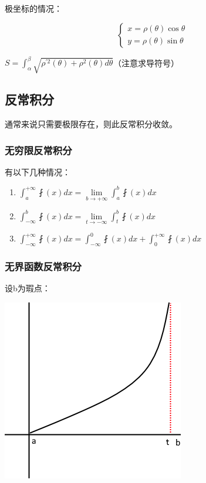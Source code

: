\documentclass[UTF8]{ctexbook}
\newcommand{\limNormal}[1]{\lim\limits_{#1}}
\newcommand{\defFunction}[1]{\fint(#1)}
\newcommand{\definiteIntegral}[2]{\int^{#1}_{#2}}
\begin{document}
{{{{  极坐标的情况：

  $$
    \begin{cases}
      x = \rho(\theta)\cos\theta \\
      y = \rho(\theta)\sin\theta
    \end{cases}
  $$

  $S = \definiteIntegral{\beta}{\alpha}\sqrt{\rho^{\prime 2}(\theta) + \rho^2(\theta)d\theta}$\qquad（注意求导符号）
}%

}%

\subsection{反常积分}{
通常来说只需要极限存在，则此反常积分收敛。

\subsubsection{无穷限反常积分}{

  有以下几种情况：

  \begin{enumerate}
    \item $\definiteIntegral{+\infty}{a}\defFunction{x}dx = \limNormal{b \to +\infty}\definiteIntegral{b}{a}\defFunction{x}dx$
    \item $\definiteIntegral{b}{-\infty}\defFunction{x}dx = \limNormal{t \to -\infty}\definiteIntegral{b}{t}\defFunction{x}dx$
    \item $\definiteIntegral{+\infty}{-\infty}\defFunction{x}dx = \definiteIntegral{0}{-\infty}\defFunction{x}dx + \definiteIntegral{+\infty}{0}\defFunction{x}dx$
  \end{enumerate}
}%


\subsubsection{无界函数反常积分}{

  设b为瑕点：

  \includegraphics[scale=0.5]{resources/infityFunctionUnormalIntegral.png}

}}}}
\end{document}
